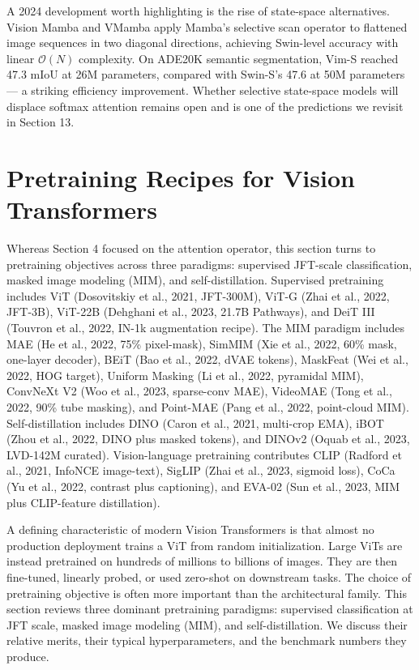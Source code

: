 \documentclass{article}
\begin{document}
A 2024 development worth highlighting is the rise of state-space alternatives. Vision Mamba \citep{zhu2024visionmambaefficie} and VMamba apply Mamba's selective scan operator to flattened image sequences in two diagonal directions, achieving Swin-level accuracy with linear \(\mathcal{O}(N)\) complexity. On ADE20K semantic segmentation, Vim-S reached 47.3 mIoU at 26M parameters, compared with Swin-S's 47.6 at 50M parameters --- a striking efficiency improvement. Whether selective state-space models will displace softmax attention remains open and is one of the predictions we revisit in Section 13.

\section{Pretraining Recipes for Vision Transformers}\label{pretraining-recipes-for-vision-transformers}

Whereas Section 4 focused on the attention operator, this section turns to pretraining objectives across three paradigms: supervised JFT-scale classification, masked image modeling (MIM), and self-distillation. Supervised pretraining includes ViT (Dosovitskiy et al., 2021, JFT-300M), ViT-G (Zhai et al., 2022, JFT-3B), ViT-22B (Dehghani et al., 2023, 21.7B Pathways), and DeiT III (Touvron et al., 2022, IN-1k augmentation recipe). The MIM paradigm includes MAE (He et al., 2022, 75\% pixel-mask), SimMIM (Xie et al., 2022, 60\% mask, one-layer decoder), BEiT (Bao et al., 2022, dVAE tokens), MaskFeat (Wei et al., 2022, HOG target), Uniform Masking (Li et al., 2022, pyramidal MIM), ConvNeXt V2 (Woo et al., 2023, sparse-conv MAE), VideoMAE (Tong et al., 2022, 90\% tube masking), and Point-MAE (Pang et al., 2022, point-cloud MIM). Self-distillation includes DINO (Caron et al., 2021, multi-crop EMA), iBOT (Zhou et al., 2022, DINO plus masked tokens), and DINOv2 (Oquab et al., 2023, LVD-142M curated). Vision-language pretraining contributes CLIP (Radford et al., 2021, InfoNCE image-text), SigLIP (Zhai et al., 2023, sigmoid loss), CoCa (Yu et al., 2022, contrast plus captioning), and EVA-02 (Sun et al., 2023, MIM plus CLIP-feature distillation).

A defining characteristic of modern Vision Transformers is that almost no production deployment trains a ViT from random initialization. Large ViTs are instead pretrained on hundreds of millions to billions of images. They are then fine-tuned, linearly probed, or used zero-shot on downstream tasks. The choice of pretraining objective is often more important than the architectural family. This section reviews three dominant pretraining paradigms: supervised classification at JFT scale, masked image modeling (MIM), and self-distillation. We discuss their relative merits, their typical hyperparameters, and the benchmark numbers they produce.
\end{document}
